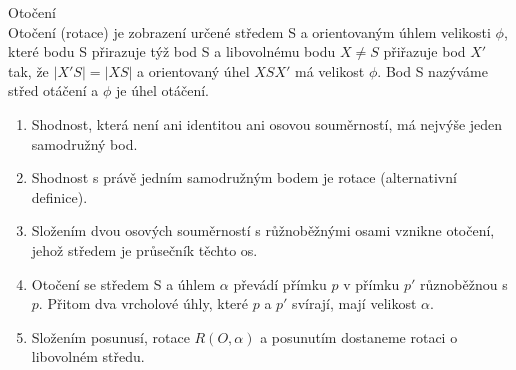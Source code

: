 \documentclass[../main.tex]{subfiles}
\begin{document}
\begin{definition}
    Otočení\\
    Otočení (rotace) je zobrazení určené středem S a orientovaným úhlem velikosti $\phi$, které bodu
    S přirazuje týž bod S a libovolnému bodu $X \neq S$ přiřazuje bod $X'$ tak, že $|X'S| = |XS|$ a orientovaný
    úhel $XSX'$ má velikost $\phi$. Bod S nazýváme střed otáčení a $\phi$ je úhel otáčení.
\end{definition}
\begin{remark}

    \begin{enumerate}
        \item Shodnost, která není ani identitou ani osovou souměrností, má nejvýše jeden samodružný bod.
        \item Shodnost s právě jedním samodružným bodem je rotace (alternativní definice).
        \item Složením dvou osových souměrností s růžnoběžnými osami vznikne otočení, jehož středem je průsečník těchto os.
        \item Otočení se středem S a úhlem $\alpha$ převádí přímku $p$ v přímku $p'$ různoběžnou s $p$. Přitom
        dva vrcholové úhly, které $p$ a $p'$ svírají, mají velikost $\alpha$.
        \item Složením posunusí, rotace $R(O,\alpha)$ a posunutím dostaneme rotaci o libovolném středu.
    \end{enumerate}
\end{remark}
\end{document}
